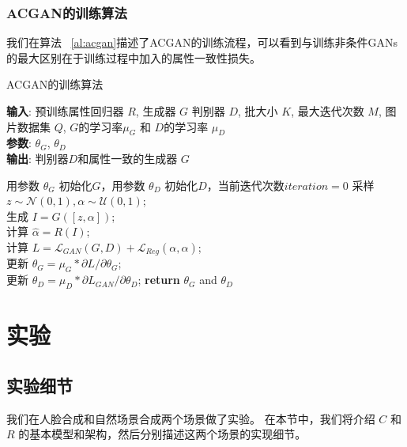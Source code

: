 \subsubsection{ACGAN的训练算法}
我们在算法 ~\ref{al:acgan}描述了ACGAN的训练流程，可以看到与训练非条件GANs的最大区别在于训练过程中加入的属性一致性损失。

\begin{algorithm}[H]
\caption{ACGAN的训练算法}
\label{al:acgan}
\textbf{输入}: 预训练属性回归器 $R$, 生成器 $G$ 判别器 $D$, 批大小 $K$, 最大迭代次数 $M$, 图片数据集 $Q$, $G$的学习率$\mu_G$ 和 $D$的学习率 $\mu_D$\\
\textbf{参数}: $\theta_G$, $\theta_D$\\
\textbf{输出}: 判别器$D$和属性一致的生成器 $G$\\
\begin{algorithmic}[1] %
\STATE 用参数 $\theta_G$ 初始化$G$，用参数 $\theta_D$ 初始化$D$，当前迭代次数$iteration=0$
\STATE 采样 $z \sim \mathcal{N}(0,1), \alpha \sim \mathcal{U}(0,1)$;\\
    \STATE 生成 $I=G([z,\alpha])$;\\
    \STATE 计算 $\hat{\alpha} = R(I)$;\\
    \STATE 计算 $L=\mathcal{L}_{GAN}(G,D) + \mathcal{L}_{Reg}(\alpha, \hat{\alpha})$;\\
    \STATE 更新 $\theta_G = \mu_G * \partial{L}/\partial{\theta_G}$;\\
    \STATE 更新 $\theta_D = \mu_D * \partial{L_{GAN}}/\partial{\theta_D}$;
\ENDWHILE
\STATE \textbf{return} $\theta_G$ and $\theta_D$
\end{algorithmic}
\end{algorithm}


\section{实验}

\subsection{实验细节}
我们在人脸合成和自然场景合成两个场景做了实验。 在本节中，我们将介绍 $C$ 和 $R$ 的基本模型和架构，然后分别描述这两个场景的实现细节。


